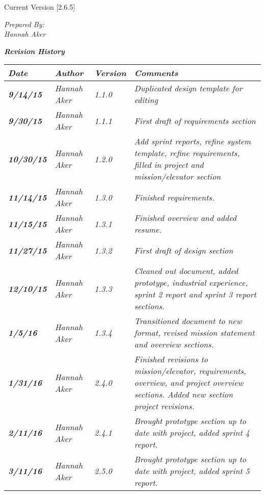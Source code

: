 


Current Version [2.6.5]
\vspace*{5mm}

{\color{SDColor5}
\noindent
\textit{Prepared By:}\\
\textit{Hannah Aker}
}

\vfill
\noindent
{ \textit{\textbf{Revision History}}}\\
\begin{tabular}{|>{\raggedright}p{1.5cm}|>{\raggedright}p{3cm}|>{\raggedright}p{1.5cm}|>{\raggedright}p{9cm}|}
\hline
\textit{\textbf{Date}} &  \textit{\textbf{Author}} & \textit{\textbf{Version}} & \textit{\textbf{Comments}}\tabularnewline
\hline
 \textit{\textbf{9/14/15}} & \textit{Hannah Aker} & \textit{1.1.0} & \textit{Duplicated design template for editing}\tabularnewline
\hline
 \textit{\textbf{9/30/15}} & \textit{Hannah Aker} & \textit{1.1.1} & \textit{First draft of requirements section}\tabularnewline
 \hline
  \textit{\textbf{10/30/15}} & \textit{Hannah Aker} & \textit{1.2.0} & \textit{Add sprint reports, refine system template, refine requirements, filled in project and mission/elevator section}\tabularnewline
\hline
 \textit{\textbf{11/14/15}} & \textit{Hannah Aker} & \textit{1.3.0} & \textit{Finished requirements.}\tabularnewline
\hline
 \textit{\textbf{11/15/15}} & \textit{Hannah Aker} & \textit{1.3.1} & \textit{Finished overview and added resume.}\tabularnewline
\hline
 \textit{\textbf{11/27/15}} & \textit{Hannah Aker} & \textit{1.3.2} & \textit{First draft of design section}\tabularnewline
\hline
 \textit{\textbf{12/10/15}} & \textit{Hannah Aker} & \textit{1.3.3} & \textit{Cleaned out document, added prototype, industrial experience, sprint 2 report and sprint 3 report sections.}\tabularnewline
\hline
 \textit{\textbf{1/5/16}} & \textit{Hannah Aker} & \textit{1.3.4} & \textit{Transitioned document to new format, revised mission statement and overview sections.}\tabularnewline
\hline
 \textit{\textbf{1/31/16}} & \textit{Hannah Aker} & \textit{2.4.0} & \textit{Finished revisions to mission/elevator, requirements, overview, and project overview sections. Added new section project revisions.}\tabularnewline
\hline
 \textit{\textbf{2/11/16}} & \textit{Hannah Aker} & \textit{2.4.1} & \textit{Brought prototype section up to date with project, added sprint 4 report.}\tabularnewline
\hline
 \textit{\textbf{3/11/16}} & \textit{Hannah Aker} & \textit{2.5.0} & \textit{Brought prototype section up to date with project, added sprint 5 report.}\tabularnewline

\end{tabular}
